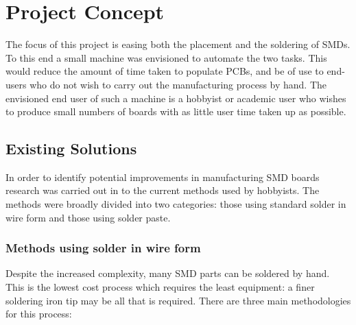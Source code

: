 \section{Project Concept}
The focus of this project is easing both the placement and the soldering
of SMDs. To this end a small machine was envisioned to automate the two
tasks. This would reduce the amount of time taken to populate PCBs, and
be of use to end-users who do not wish to carry out the manufacturing
process by hand. The envisioned end user of such a machine is a
hobbyist or academic user who wishes to produce small numbers of boards
with as little user time taken up as possible.



\subsection{Existing Solutions}
In order to identify potential improvements in manufacturing SMD boards
research was carried out in to the current methods used by hobbyists.
The methods were broadly divided into two categories: those using standard
solder in wire form and those using solder paste. %

\subsubsection{Methods using solder in wire form}
Despite the increased complexity, many SMD parts can be soldered by hand.
This is the lowest cost process which requires the least equipment: a
finer soldering iron tip may be all that is required. There are three 
main methodologies for this process:

